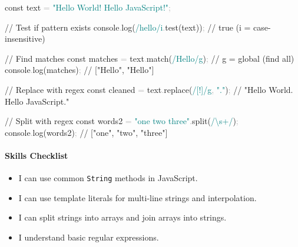 \documentclass[
  justified,
  openright,
]{tufte-book}
\let\subsubsection\paragraph
\let\paragraph\paragraph
\newcommand{\BuiltInTok}[1]{#1}
\newcommand{\CommentTok}[1]{\textcolor{MidGray}{#1}}
\newcommand{\FunctionTok}[1]{\textcolor{BrandBlue}{#1}}
\newcommand{\KeywordTok}[1]{\textcolor{BrandBlue}{#1}}
\newcommand{\NormalTok}[1]{#1}
\newcommand{\OperatorTok}[1]{\textcolor{DarkGray}{#1}}
\newcommand{\SpecialCharTok}[1]{\textcolor{Teal}{#1}}
\newcommand{\SpecialStringTok}[1]{\textcolor{Teal}{#1}}
\newcommand{\StringTok}[1]{\textcolor{Teal}{#1}}
\newenvironment{Shaded}{%
  \begin{snugshade}
}{%
  \end{snugshade}
}
\let\subsubsection\paragraph
\let\paragraph\paragraph
\providecommand{\tightlist}{%
  \setlength{\itemsep}{0pt}\setlength{\parskip}{0pt}}
\begin{document}
\begin{Shaded}
\begin{Highlighting}[]
\KeywordTok{const}\NormalTok{ text }\OperatorTok{=} \StringTok{"Hello World! Hello JavaScript!"}\OperatorTok{;}

\CommentTok{// Test if pattern exists}
\BuiltInTok{console}\OperatorTok{.}\FunctionTok{log}\NormalTok{(}\SpecialStringTok{/hello/i}\OperatorTok{.}\FunctionTok{test}\NormalTok{(text))}\OperatorTok{;} \CommentTok{// true (i = case{-}insensitive)}

\CommentTok{// Find matches}
\KeywordTok{const}\NormalTok{ matches }\OperatorTok{=}\NormalTok{ text}\OperatorTok{.}\FunctionTok{match}\NormalTok{(}\SpecialStringTok{/Hello/g}\NormalTok{)}\OperatorTok{;} \CommentTok{// g = global (find all)}
\BuiltInTok{console}\OperatorTok{.}\FunctionTok{log}\NormalTok{(matches)}\OperatorTok{;} \CommentTok{// ["Hello", "Hello"]}

\CommentTok{// Replace with regex}
\KeywordTok{const}\NormalTok{ cleaned }\OperatorTok{=}\NormalTok{ text}\OperatorTok{.}\FunctionTok{replace}\NormalTok{(}\SpecialStringTok{/}\SpecialCharTok{[!]}\SpecialStringTok{/g}\OperatorTok{,} \StringTok{"."}\NormalTok{)}\OperatorTok{;} \CommentTok{// "Hello World. Hello JavaScript."}

\CommentTok{// Split with regex}
\KeywordTok{const}\NormalTok{ words2 }\OperatorTok{=} \StringTok{"one  two   three"}\OperatorTok{.}\FunctionTok{split}\NormalTok{(}\SpecialStringTok{/}\SpecialCharTok{\textbackslash{}s+}\SpecialStringTok{/}\NormalTok{)}\OperatorTok{;}
\BuiltInTok{console}\OperatorTok{.}\FunctionTok{log}\NormalTok{(words2)}\OperatorTok{;} \CommentTok{// ["one", "two", "three"]}
\end{Highlighting}
\end{Shaded}

\subsubsection{Skills Checklist}\label{skills-checklist-10}

\begin{itemize}
\tightlist
\item[$\square$]
  I can use common \texttt{String} methods in JavaScript.
\item[$\square$]
  I can use template literals for multi-line strings and interpolation.
\item[$\square$]
  I can split strings into arrays and join arrays into strings.
\item[$\square$]
  I understand basic regular expressions.
\end{itemize}
\end{document}
